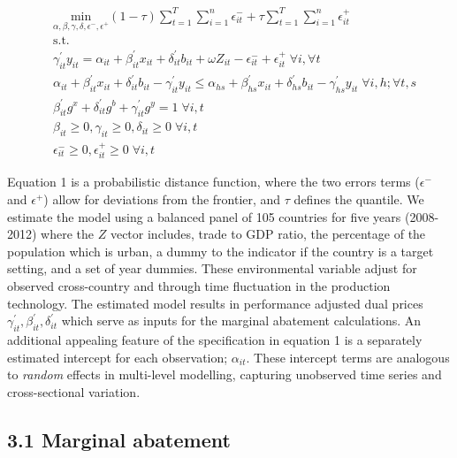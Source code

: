 \documentclass[
  10pt,
]{article}
\begin{document}
\begin{equation}
\begin{split}
& \underset{\alpha,\beta,\gamma,\delta,\epsilon^-,\epsilon^+}{\text{min}}
 (1-\tau) \sum^{T}_{t=1} \sum^{n}_{i=1}\epsilon^-_{it} + \tau \sum^{T}_{t=1}  \sum^{n}_{i=1}\epsilon^+_{it}  \\
&\text{s.t.} \\
&\gamma^{'}_{it}y_{it}=\alpha_{it}+\beta^{'}_{it}x_{it}+\delta^{'}_{it}b_{it} + \omega Z_{it} -\epsilon^-_{it}+\epsilon^+_{it} \; \forall i ,\forall t \\
&\alpha_{it}+\beta^{'}_{it}x_{it}+\delta^{'}_{it}b_{it}-\gamma^{'}_{it}y_{it} \leq \alpha_{hs}+\beta^{'}_{hs}x_{it}+\delta^{'}_{hs}b_{it}-\gamma^{'}_{hs}y_{it} \; \forall i,h ; \forall t,s \\
& \beta^{'}_{it}g^x+\delta^{'}_{it}g^b+\gamma^{'}_{it}g^y=1 \; \forall i,t\\
& \beta_{it} \geq0,\gamma_{it} \geq0,\delta_{it} \geq0 \; \forall i,t \\
& \epsilon^-_{it} \geq0, \epsilon^+_{it} \geq 0 \; \forall i,t
\end{split}
\end{equation}

Equation 1 is a probabilistic distance function, where the two errors
terms (\(\epsilon^-\) and \(\epsilon^+\)) allow for deviations from the
frontier, and \(\tau\) defines the quantile. We estimate the model using
a balanced panel of 105 countries for five years (2008-2012) where the
\(Z\) vector includes, trade to GDP ratio, the percentage of the
population which is urban, a dummy to the indicator if the country is a
target setting, and a set of year dummies. These environmental variable
adjust for observed cross-country and through time fluctuation in the
production technology. The estimated model results in performance
adjusted dual prices \(\gamma^{'}_{it},\beta^{'}_{it} ,\delta^{'}_{it}\)
which serve as inputs for the marginal abatement calculations. An
additional appealing feature of the specification in equation 1 is a
separately estimated intercept for each observation; \(\alpha_{it}\).
These intercept terms are analogous to \emph{random} effects in
multi-level modelling, capturing unobserved time series and
cross-sectional variation.

\hypertarget{marginal-abatement}{%
\subsection{3.1 Marginal abatement}\label{marginal-abatement}}
\end{document}
